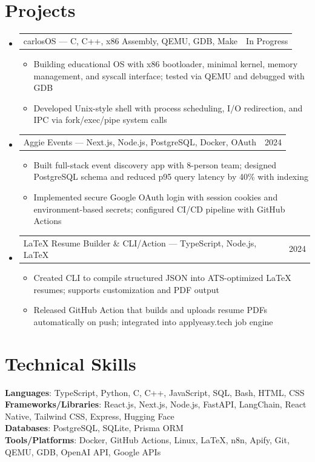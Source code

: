\documentclass[letterpaper,11pt]{article}
\makeatletter
\newcommand{\resumeItem}[1]{
  \item\small{{#1 \vspace{-2pt}}}
}
\newcommand{\resumeProjectHeading}[2]{
    \item
    \begin{tabular*}{0.97\textwidth}{l@{\extracolsep{\fill}}r}
      \small#1 & #2 \\
    \end{tabular*}\vspace{-7pt}
}
\newcommand{\resumeSubHeadingListStart}{\begin{itemize}[leftmargin=0.15in, label={}]}
\newcommand{\resumeSubHeadingListEnd}{\end{itemize}}
\newcommand{\resumeItemListStart}{\begin{itemize}}
\newcommand{\resumeItemListEnd}{\end{itemize}\vspace{-5pt}}
\makeatother
\begin{document}
\section{Projects}
\resumeSubHeadingListStart
  \resumeProjectHeading
    {carlosOS — C, C++, x86 Assembly, QEMU, GDB, Make}{In Progress}
    \resumeItemListStart
      \resumeItem{Building educational OS with x86 bootloader, minimal kernel, memory management, and syscall interface; tested via QEMU and debugged with GDB}
      \resumeItem{Developed Unix-style shell with process scheduling, I/O redirection, and IPC via fork/exec/pipe system calls}
    \resumeItemListEnd

  \resumeProjectHeading
    {Aggie Events — Next.js, Node.js, PostgreSQL, Docker, OAuth}{2024}
    \resumeItemListStart
      \resumeItem{Built full-stack event discovery app with 8-person team; designed PostgreSQL schema and reduced p95 query latency by 40\% with indexing}
      \resumeItem{Implemented secure Google OAuth login with session cookies and environment-based secrets; configured CI/CD pipeline with GitHub Actions}
    \resumeItemListEnd

  \resumeProjectHeading
    {LaTeX Resume Builder \& CLI/Action — TypeScript, Node.js, LaTeX}{2024}
    \resumeItemListStart
      \resumeItem{Created CLI to compile structured JSON into ATS-optimized LaTeX resumes; supports customization and PDF output}
      \resumeItem{Released GitHub Action that builds and uploads resume PDFs automatically on push; integrated into applyeasy.tech job engine}
    \resumeItemListEnd
\resumeSubHeadingListEnd

\section{Technical Skills}
\begin{itemize}[leftmargin=0.15in, label={}]
  \small{\item{
    \textbf{Languages}{: TypeScript, Python, C, C++, JavaScript, SQL, Bash, HTML, CSS} \\
    \textbf{Frameworks/Libraries}{: React.js, Next.js, Node.js, FastAPI, LangChain, React Native, Tailwind CSS, Express, Hugging Face} \\
    \textbf{Databases}{: PostgreSQL, SQLite, Prisma ORM} \\
    \textbf{Tools/Platforms}{: Docker, GitHub Actions, Linux, LaTeX, n8n, Apify, Git, QEMU, GDB, OpenAI API, Google APIs}
  }}
\end{itemize}
\end{document}
